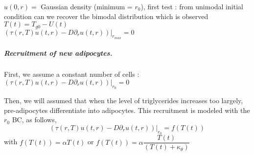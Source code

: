 \documentclass[11pt,a4paper]{article}
\begin{document}
$u(0, r) =$ Gaussian density (minimum = $r_{0}$), first test : from unimodal initial condition can we recover the bimodal distribution which is observed \\
$T(t) = T_{g0} - U(t)$\\
$(\tau(r, T) u(t,r) - D \partial_r u(t,r)) |_{r_{max}} = 0$

\subparagraph{Recruitment of new adipocytes.} 

First, we assume a constant number of cells : $(\tau(r, T) u(t,r) - D \partial_r u(t,r)) |_{r_{0}}= 0$


Then, we will assumed that when the level of triglycerides increases too largely, pre-adipocytes differentiate into adipocytes. This recruitment is modeled with the $r_0$ BC, as follows,
$$(\tau(r, T) u(t,r) - D \partial_r u(t,r)) |_{r_{0}}= f(T(t))$$ with $f(T(t)) = \alpha T(t)$ or $f(T(t)) = \alpha \dfrac{T(t)}{(T(t)+\kappa_{\theta})}$ 
\end{document}
